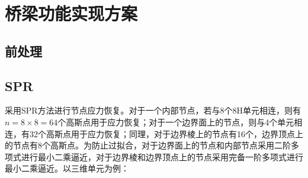 \documentclass[UTF8]{ctexbook}
\begin{document}
\section{桥梁功能实现方案}
\subsection{前处理}

\subsection{SPR}

采用SPR方法进行节点应力恢复。对于一个内部节点，若与8个8H单元相连，则有$n=8\times8=64$个高斯点用于应力恢复；对于一个边界面上的节点，则与4个单元相连，有32个高斯点用于应力恢复；同理，对于边界棱上的节点有16个，边界顶点上的节点有8个高斯点。为防止过拟合，对于边界面上的节点和内部节点采用二阶多项式进行最小二乘逼近，对于边界棱和边界顶点上的节点采用完备一阶多项式进行最小二乘逼近。以三维单元为例：
\end{document}
